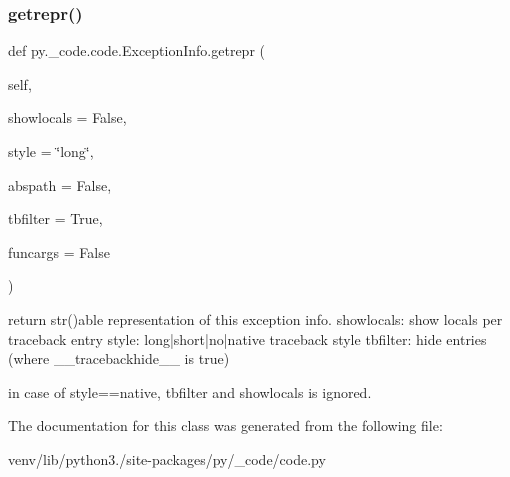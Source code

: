\subsubsection{\texorpdfstring{getrepr()}{getrepr()}}
{\footnotesize\ttfamily def py.\+\_\+code.\+code.\+Exception\+Info.\+getrepr (\begin{DoxyParamCaption}\item[{}]{self,  }\item[{}]{showlocals = {\ttfamily False},  }\item[{}]{style = {\ttfamily \char`\"{}long\char`\"{}},  }\item[{}]{abspath = {\ttfamily False},  }\item[{}]{tbfilter = {\ttfamily True},  }\item[{}]{funcargs = {\ttfamily False} }\end{DoxyParamCaption})}

\begin{DoxyVerb}return str()able representation of this exception info.
    showlocals: show locals per traceback entry
    style: long|short|no|native traceback style
    tbfilter: hide entries (where __tracebackhide__ is true)

    in case of style==native, tbfilter and showlocals is ignored.
\end{DoxyVerb}
 

The documentation for this class was generated from the following file\+:\begin{DoxyCompactItemize}
\item 
venv/lib/python3./site-\/packages/py/\+\_\+code/code.\+py\end{DoxyCompactItemize}
